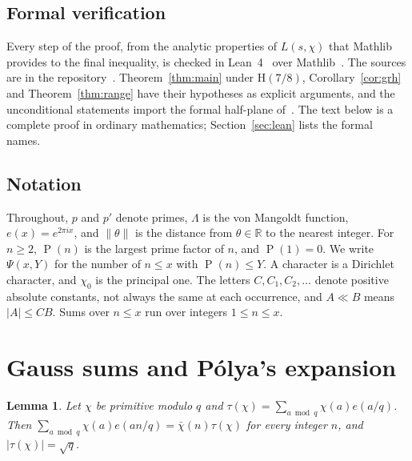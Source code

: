 \documentclass[11pt]{amsart}
\newtheorem{lemma}[theorem]{Lemma}
\theoremstyle{definition}
\theoremstyle{remark}
\numberwithin{equation}{section}
\newcommand{\e}{e}
\newcommand{\nint}[1]{\|#1\|}
\DeclareMathOperator{\gpf}{P}
\begin{document}
\subsection*{Formal verification}

Every step of the proof, from the analytic properties of $L(s,\chi)$ that
Mathlib provides to the final inequality, is checked in Lean~4~\cite{lean4}
over Mathlib~\cite{mathlib20}. The sources are in the repository~\cite{repo}.
Theorem~\ref{thm:main} under $\mathrm H(7/8)$, Corollary~\ref{cor:grh} and
Theorem~\ref{thm:range} have their hypotheses as explicit arguments, and the
unconditional statements import the formal half-plane of~\cite{openai}. The
text below is a complete proof in ordinary mathematics; Section~\ref{sec:lean}
lists the formal names.

\subsection*{Notation}

Throughout, $p$ and $p'$ denote primes, $\Lambda$ is the von Mangoldt function,
$\e(x)=\e^{2\pi ix}$, and $\nint\theta$ is the distance from $\theta\in\mathbb
R$ to the nearest integer. For $n\ge2$, $\gpf(n)$ is the largest prime factor
of $n$, and $\gpf(1)=0$. We write $\Psi(x,Y)$ for the number of $n\le x$ with
$\gpf(n)\le Y$. A character is a Dirichlet character, and $\chi_0$ is the
principal one. The letters $C,C_1,C_2,\dots$ denote positive absolute
constants, not always the same at each occurrence, and $A\ll B$ means $|A|\le
CB$. Sums over $n\le x$ run over integers $1\le n\le x$.

\section{Gauss sums and P\'olya's expansion}\label{sec:polya}

\begin{lemma}\label{lem:gauss}
Let $\chi$ be primitive modulo $q$ and $\tau(\chi)=\sum_{a\bmod
q}\chi(a)\e(a/q)$. Then $\sum_{a\bmod q}\chi(a)\e(an/q)=\bar\chi(n)\tau(\chi)$
for every integer $n$, and $|\tau(\chi)|=\sqrt q$.
\end{lemma}
\end{document}
